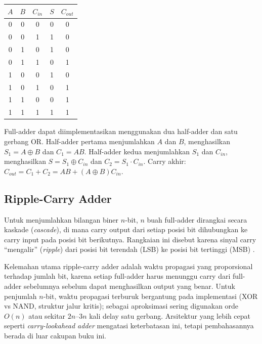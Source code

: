 \begin{center}
\renewcommand{\arraystretch}{1.2}
\begin{tabular}{|c|c|c||c|c|}
\hline
$A$ & $B$ & $C_{in}$ & $S$ & $C_{out}$ \\ \hline
0 & 0 & 0 & 0 & 0 \\ \hline
0 & 0 & 1 & 1 & 0 \\ \hline
0 & 1 & 0 & 1 & 0 \\ \hline
0 & 1 & 1 & 0 & 1 \\ \hline
1 & 0 & 0 & 1 & 0 \\ \hline
1 & 0 & 1 & 0 & 1 \\ \hline
1 & 1 & 0 & 0 & 1 \\ \hline
1 & 1 & 1 & 1 & 1 \\ \hline
\end{tabular}
\end{center}

\begin{konsep}
Full-adder dapat diimplementasikan menggunakan dua half-adder dan satu gerbang OR. Half-adder pertama menjumlahkan $A$ dan $B$, menghasilkan $S_1 = A \oplus B$ dan $C_1 = AB$. Half-adder kedua menjumlahkan $S_1$ dan $C_{in}$, menghasilkan $S = S_1 \oplus C_{in}$ dan $C_2 = S_1 \cdot C_{in}$. Carry akhir: $C_{out} = C_1 + C_2 = AB + (A \oplus B)C_{in}$.
\end{konsep}

\subsection{Ripple-Carry Adder}

Untuk menjumlahkan bilangan biner $n$-bit, $n$ buah full-adder dirangkai secara kaskade (\textit{cascade}), di mana carry output dari setiap posisi bit dihubungkan ke carry input pada posisi bit berikutnya. Rangkaian ini disebut  karena sinyal carry ``mengalir'' (\textit{ripple}) dari posisi bit terendah (LSB) ke posisi bit tertinggi (MSB) \cite{wiki_adder}.

Kelemahan utama ripple-carry adder adalah waktu propagasi yang proporsional terhadap jumlah bit, karena setiap full-adder harus menunggu carry dari full-adder sebelumnya sebelum dapat menghasilkan output yang benar. Untuk penjumlah $n$-bit, waktu propagasi terburuk bergantung pada implementasi (XOR vs NAND, struktur jalur kritis); sebagai aproksimasi sering digunakan orde $O(n)$ atau sekitar $2n$--$3n$ kali delay satu gerbang. Arsitektur yang lebih cepat seperti \textit{carry-lookahead adder} mengatasi keterbatasan ini, tetapi pembahasannya berada di luar cakupan buku ini.
